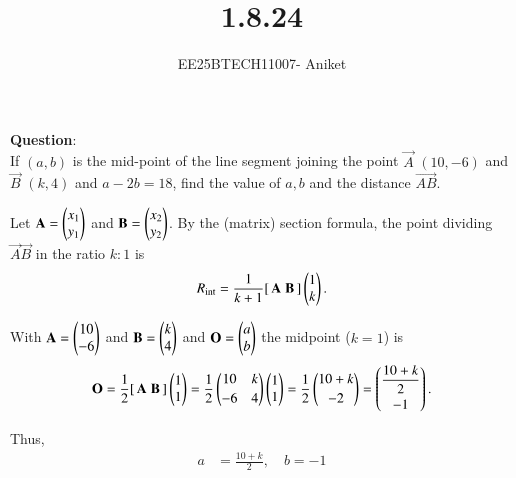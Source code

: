 \documentclass[journal]{IEEEtran}
\begin{document}

\vspace{3cm}

\title{1.8.24}
\author{EE25BTECH11007- Aniket}
\maketitle
{\let\newpage\relax\maketitle}

\setlength{\intextsep}{10pt}

\textbf{Question}:\\
If $(a,b)$ is the mid-point of the line segment joining the point 
$\vec{A}$ $(10,-6)$ and $\vec{B}$ $(k,4)$ and $a-2b=18$, find the value of $a,b$ and the distance $\vec{AB}$.\\
\solution

\setcounter{equation}{0}
\renewcommand{\theequation}{\arabic{equation}}

Let
\(\mathbf{A}=\begin{pmatrix}x_1\\ y_1\end{pmatrix}\) and \(\mathbf{B}=\begin{pmatrix}x_2\\ y_2\end{pmatrix}\).
By the (matrix) section formula, the point dividing \(\vec{A}\vec{B}\) in the ratio \(k:1\) is
\begin{equation}
R_{\text{int}}=\frac{1}{k+1}[\,\mathbf{A}\;\mathbf{B}\,]\begin{pmatrix}1\\ k\end{pmatrix}.
\end{equation}

\medskip

With \(\mathbf{A}=\begin{pmatrix}10\\-6\end{pmatrix}\) and \(\mathbf{B}=\begin{pmatrix}k\\4\end{pmatrix}\) and \(\mathbf{O}=\begin{pmatrix}a\\b\end{pmatrix}\) the midpoint (\(k=1\)) is
\begin{equation}
\mathbf{O}=\frac12[\,\mathbf{A}\;\mathbf{B}\,]\begin{pmatrix}1\\1\end{pmatrix}
=\frac12\begin{pmatrix}10 & k\\[2pt] -6 & 4\end{pmatrix}\begin{pmatrix}1\\1\end{pmatrix}
=\frac12\begin{pmatrix}10+k\\[2pt]-2\end{pmatrix}
=\begin{pmatrix}\dfrac{10+k}{2}\\[6pt]-1\end{pmatrix}.
\end{equation}

Thus,
\begin{align}
a &= \frac{10+k}{2}, \quad b = -1 \tag{3}
\end{align}
\end{document}
